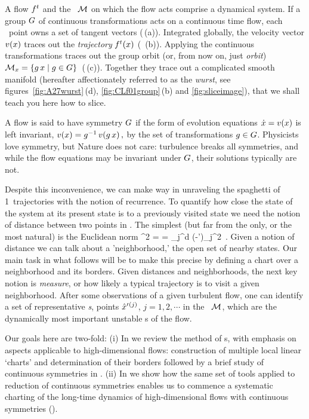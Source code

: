 \documentclass[aip,cha,reprint,
secnumarabic,
nofootinbib, tightenlines,
nobibnotes, showkeys, showpacs,
groupedaddress
]{revtex4-1}
\begin{document}
A flow $f^t$ and the \statesp\ ${\cal M}$ on which the flow acts comprise a
{dynamical system}. If a group $G$ of continuous transformations
acts on a continuous time flow, each \statesp\ point owns a set of
tangent vectors (\,(a)). Integrated globally, the
velocity vector $v(x)$ traces out the {\em trajectory}
${f^{t}(x)}$ ( \,(b)). Applying the continuous
transformations traces out the {group orbit} (or, from now on, just
\emph{orbit})
\(
{\cal M}_{x} = \{g\,x \mid g \in {\ensuremath{G}}\}
\,
\) %
(\,(c)). Together they trace out a complicated smooth
manifold (hereafter affectionately referred to as the {\em wurst}, see
figures~\ref{fig:A27wurst}\,(d), \ref{fig:CLf01group}\,(b) and
\ref{fig:sliceimage}), that we shall teach you here how to slice.

A flow is said to have symmetry $G$ if the form of evolution
equations $\dot{x} = v(x)$ is left invariant,
\(
v(x)=g^{-1} \, v(g \, x)
\,,
\) %
by the set of transformations $g \in {\ensuremath{G}}$. Physicists love
symmetry, but Nature does not care: turbulence breaks all symmetries,
and while the flow equations may be invariant under $G$, their
solutions typically are not.

Despite this inconvenience, we can make way in unraveling the spaghetti
of 1\dmn\ trajectories with the notion of recurrence. To quantify how
close the state of the system at its present state is to a previously
visited state we need the notion of distance between two points in
\statesp. The simplest (but far from the only, or the most natural) is
the Euclidean norm
\beq
  ^2  =  =
\sum_j^d
(\ssp-\ssp')_j^2
\,.
Given a notion of distance we can talk about a 'neighborhood,' the open
set of nearby states. Our main task in what follows will be to make this
precise by defining a chart over a neighborhood and its borders. Given
distances and neighborhoods, the next key notion is  \emph{measure}, or
how likely a typical trajectory is to visit a given neighborhood. After
some observations of a given turbulent flow, one can identify a set of
representative \emph{\template s},
{points} ${\hat{x}'}{}^{(j)}$, $j=1,2,\cdots$ in the \statesp\ ${\cal M}$, which
are the dynamically most important unstable {\recurrStr s} of the flow.

Our goals here are two-fold:
(i) In  we review the method of \PoincSec s, with
    emphasis on aspects applicable to high-dimensional flows:
    construction of multiple local linear `charts' and determination of
    their borders followed by a brief study of continuous symmetries in
    .
(ii) In  we show how the same set of tools applied to
    reduction of continuous symmetries enables us to commence a
    systematic charting of the long-time dynamics of high-dimensional
    flows with continuous symmetries ().
\end{document}
